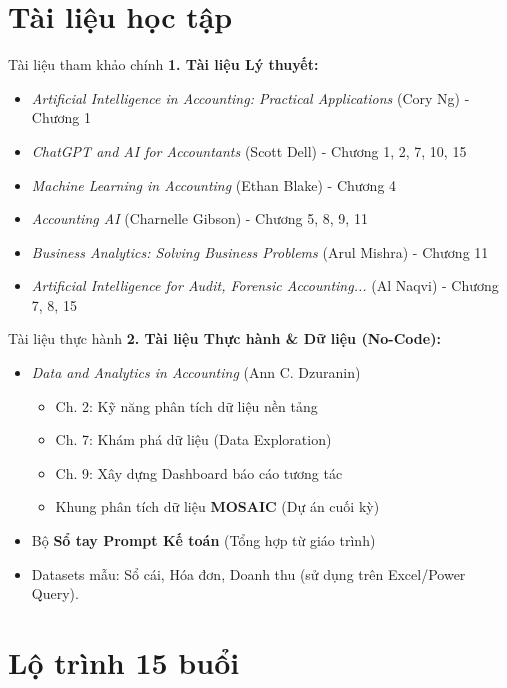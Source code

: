 \documentclass[aspectratio=169]{beamer}
\begin{document}
\section{Tài liệu học tập}
\begin{frame}{Tài liệu tham khảo chính}
    \textbf{1. Tài liệu Lý thuyết:}
    \begin{itemize}
        \item \textit{Artificial Intelligence in Accounting: Practical Applications} (Cory Ng) - Chương 1
        \item \textit{ChatGPT and AI for Accountants} (Scott Dell) - Chương 1, 2, 7, 10, 15
        \item \textit{Machine Learning in Accounting} (Ethan Blake) - Chương 4
        \item \textit{Accounting AI} (Charnelle Gibson) - Chương 5, 8, 9, 11
        \item \textit{Business Analytics: Solving Business Problems} (Arul Mishra) - Chương 11
        \item \textit{Artificial Intelligence for Audit, Forensic Accounting...} (Al Naqvi) - Chương 7, 8, 15
    \end{itemize}
\end{frame}

\begin{frame}{Tài liệu thực hành}
    \textbf{2. Tài liệu Thực hành \& Dữ liệu (No-Code):}
    \begin{itemize}
        \item \textit{Data and Analytics in Accounting} (Ann C. Dzuranin)
        \begin{itemize}
            \item Ch. 2: Kỹ năng phân tích dữ liệu nền tảng
            \item Ch. 7: Khám phá dữ liệu (Data Exploration)
            \item Ch. 9: Xây dựng Dashboard báo cáo tương tác
            \item Khung phân tích dữ liệu \textbf{MOSAIC} (Dự án cuối kỳ)
        \end{itemize}
        \item Bộ \textbf{Sổ tay Prompt Kế toán} (Tổng hợp từ giáo trình)
        \item Datasets mẫu: Sổ cái, Hóa đơn, Doanh thu (sử dụng trên Excel/Power Query).
    \end{itemize}
\end{frame}

\section{Lộ trình 15 buổi}
\end{document}
